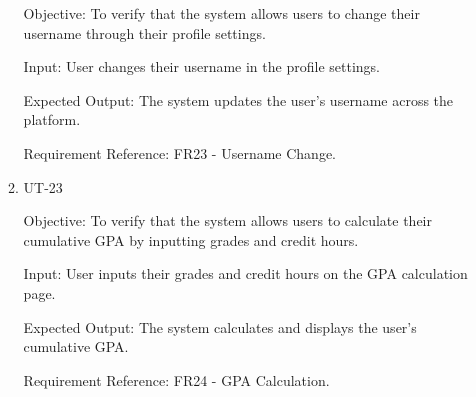 \documentclass[12pt, titlepage]{article}
\begin{document}
\begin{enumerate}
\begin{enumerate}
        Objective: To verify that the system allows users to change their username through their profile settings.
        
        Input: User changes their username in the profile settings.
        
        Expected Output: The system updates the user's username across the platform.
        
        Requirement Reference: FR23 - Username Change.
        
    \item{UT-23\\}\label{UT-23}
    
        Objective: To verify that the system allows users to calculate their cumulative GPA by inputting grades and credit hours.
        
        Input: User inputs their grades and credit hours on the GPA calculation page.
        
        Expected Output: The system calculates and displays the user's cumulative GPA.
        
        Requirement Reference: FR24 - GPA Calculation.
\end{enumerate}


\end{enumerate}
\end{document}
